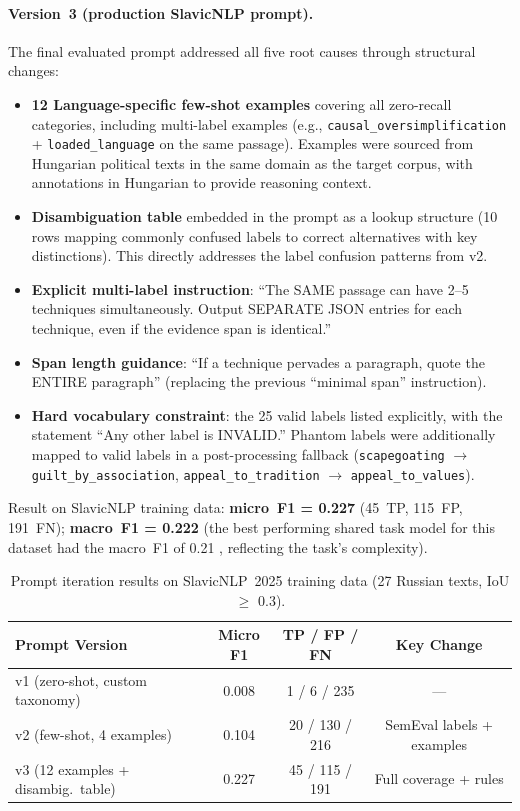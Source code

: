 \documentclass[10pt, a4paper]{article}
\begin{document}
\paragraph{Version~3 (production SlavicNLP prompt).}
The final evaluated prompt addressed all five root causes through structural changes:

\begin{itemize}
\item \textbf{12 Language-specific few-shot examples} covering all zero-recall categories, including multi-label examples (e.g., \texttt{causal\_oversimplification} + \texttt{loaded\_language} on the same passage). Examples were sourced from Hungarian political texts in the same domain as the target corpus, with annotations in Hungarian to provide reasoning context.
\item \textbf{Disambiguation table} embedded in the prompt as a lookup structure (10 rows mapping commonly confused labels to correct alternatives with key distinctions). This directly addresses the label confusion patterns from v2.
\item \textbf{Explicit multi-label instruction}: ``The SAME passage can have 2--5 techniques simultaneously. Output SEPARATE JSON entries for each technique, even if the evidence span is identical.''
\item \textbf{Span length guidance}: ``If a technique pervades a paragraph, quote the ENTIRE paragraph'' (replacing the previous ``minimal span'' instruction).
\item \textbf{Hard vocabulary constraint}: the 25 valid labels listed explicitly, with the statement ``Any other label is INVALID.'' Phantom labels were additionally mapped to valid labels in a post-processing fallback (\texttt{scapegoating} $\to$ \texttt{guilt\_by\_association}, \texttt{appeal\_to\_tradition} $\to$ \texttt{appeal\_to\_values}).
\end{itemize}

Result on SlavicNLP training data: \textbf{micro~F1 = 0.227} (45~TP, 115~FP, 191~FN); \textbf{macro~F1 = 0.222} (the best performing shared task model for this dataset had the macro~F1 of 0.21 \citep{piskorski2025slavicnlp}, reflecting the task’s complexity).

\begin{table}[h]
\centering
\small
\begin{tabular}{lccc}
  \hline
  \textbf{Prompt Version} & \textbf{Micro F1} & \textbf{TP / FP / FN} & \textbf{Key Change} \\
  \hline
  v1 (zero-shot, custom taxonomy) & 0.008 & 1 / 6 / 235 & --- \\
  v2 (few-shot, 4 examples) & 0.104 & 20 / 130 / 216 & SemEval labels + examples \\
  v3 (12 examples + disambig.\ table) & 0.227 & 45 / 115 / 191 & Full coverage + rules \\
  \hline
\end{tabular}
\caption{Prompt iteration results on SlavicNLP~2025 training data (27 Russian texts, IoU $\geq$ 0.3).}
\label{tab:manipulation_iterations}
\end{table}
\end{document}
